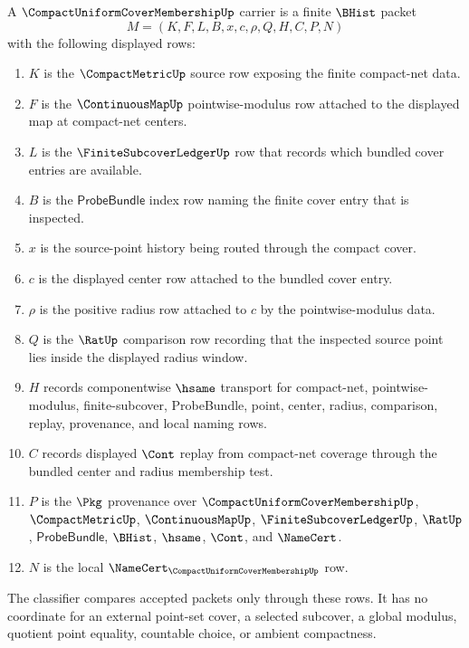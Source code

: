 \begin{definition}
\label{def:compact-uniform-cover-membership-carrier}
A $\CompactUniformCoverMembershipUp$ carrier is a finite $\BHist$ packet
$$
M=(K,F,L,B,x,c,\rho,Q,H,C,P,N)
$$
with the following displayed rows:
\begin{enumerate}
\item $K$ is the $\CompactMetricUp$ source row exposing the finite compact-net data.
\item $F$ is the $\ContinuousMapUp$ pointwise-modulus row attached to the displayed map at compact-net centers.
\item $L$ is the $\FiniteSubcoverLedgerUp$ row that records which bundled cover entries are available.
\item $B$ is the $\mathsf{ProbeBundle}$ index row naming the finite cover entry that is inspected.
\item $x$ is the source-point history being routed through the compact cover.
\item $c$ is the displayed center row attached to the bundled cover entry.
\item $\rho$ is the positive radius row attached to $c$ by the pointwise-modulus data.
\item $Q$ is the $\RatUp$ comparison row recording that the inspected source point lies inside the displayed radius window.
\item $H$ records componentwise $\hsame$ transport for compact-net, pointwise-modulus, finite-subcover, ProbeBundle, point, center, radius, comparison, replay, provenance, and local naming rows.
\item $C$ records displayed $\Cont$ replay from compact-net coverage through the bundled center and radius membership test.
\item $P$ is the $\Pkg$ provenance over $\CompactUniformCoverMembershipUp$, $\CompactMetricUp$, $\ContinuousMapUp$, $\FiniteSubcoverLedgerUp$, $\RatUp$, $\mathsf{ProbeBundle}$, $\BHist$, $\hsame$, $\Cont$, and $\NameCert$.
\item $N$ is the local $\NameCert_{\CompactUniformCoverMembershipUp}$ row.
\end{enumerate}
The classifier compares accepted packets only through these rows. It has no coordinate for an external point-set cover, a selected subcover, a global modulus, quotient point equality, countable choice, or ambient compactness.
\end{definition}

